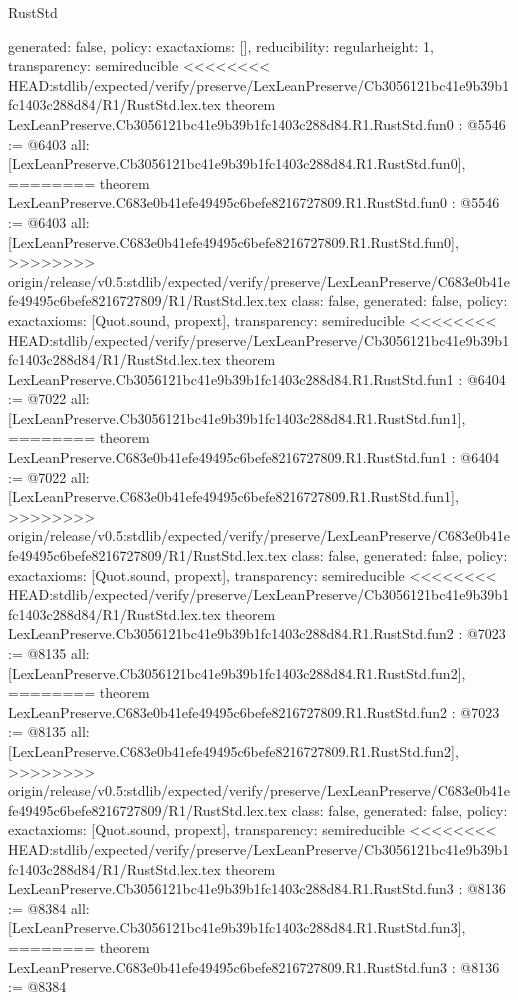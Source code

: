 \begin{lexlean}{RustStd}
\begin{coremodule}
{\begin{coremodule}
{{{  generated: false,
  policy: exact{axioms: []},
  reducibility: regular{height: 1},
  transparency: semireducible
}
<<<<<<<< HEAD:stdlib/expected/verify/preserve/LexLeanPreserve/Cb3056121bc41e9b39b1fc1403c288d84/R1/RustStd.lex.tex
theorem LexLeanPreserve.Cb3056121bc41e9b39b1fc1403c288d84.R1.RustStd.fun0 : @5546 := @6403 {
  all: [LexLeanPreserve.Cb3056121bc41e9b39b1fc1403c288d84.R1.RustStd.fun0],
========
theorem LexLeanPreserve.C683e0b41efe49495c6befe8216727809.R1.RustStd.fun0 : @5546 := @6403 {
  all: [LexLeanPreserve.C683e0b41efe49495c6befe8216727809.R1.RustStd.fun0],
>>>>>>>> origin/release/v0.5:stdlib/expected/verify/preserve/LexLeanPreserve/C683e0b41efe49495c6befe8216727809/R1/RustStd.lex.tex
  class: false,
  generated: false,
  policy: exact{axioms: [Quot.sound, propext]},
  transparency: semireducible
}
<<<<<<<< HEAD:stdlib/expected/verify/preserve/LexLeanPreserve/Cb3056121bc41e9b39b1fc1403c288d84/R1/RustStd.lex.tex
theorem LexLeanPreserve.Cb3056121bc41e9b39b1fc1403c288d84.R1.RustStd.fun1 : @6404 := @7022 {
  all: [LexLeanPreserve.Cb3056121bc41e9b39b1fc1403c288d84.R1.RustStd.fun1],
========
theorem LexLeanPreserve.C683e0b41efe49495c6befe8216727809.R1.RustStd.fun1 : @6404 := @7022 {
  all: [LexLeanPreserve.C683e0b41efe49495c6befe8216727809.R1.RustStd.fun1],
>>>>>>>> origin/release/v0.5:stdlib/expected/verify/preserve/LexLeanPreserve/C683e0b41efe49495c6befe8216727809/R1/RustStd.lex.tex
  class: false,
  generated: false,
  policy: exact{axioms: [Quot.sound, propext]},
  transparency: semireducible
}
<<<<<<<< HEAD:stdlib/expected/verify/preserve/LexLeanPreserve/Cb3056121bc41e9b39b1fc1403c288d84/R1/RustStd.lex.tex
theorem LexLeanPreserve.Cb3056121bc41e9b39b1fc1403c288d84.R1.RustStd.fun2 : @7023 := @8135 {
  all: [LexLeanPreserve.Cb3056121bc41e9b39b1fc1403c288d84.R1.RustStd.fun2],
========
theorem LexLeanPreserve.C683e0b41efe49495c6befe8216727809.R1.RustStd.fun2 : @7023 := @8135 {
  all: [LexLeanPreserve.C683e0b41efe49495c6befe8216727809.R1.RustStd.fun2],
>>>>>>>> origin/release/v0.5:stdlib/expected/verify/preserve/LexLeanPreserve/C683e0b41efe49495c6befe8216727809/R1/RustStd.lex.tex
  class: false,
  generated: false,
  policy: exact{axioms: [Quot.sound, propext]},
  transparency: semireducible
}
<<<<<<<< HEAD:stdlib/expected/verify/preserve/LexLeanPreserve/Cb3056121bc41e9b39b1fc1403c288d84/R1/RustStd.lex.tex
theorem LexLeanPreserve.Cb3056121bc41e9b39b1fc1403c288d84.R1.RustStd.fun3 : @8136 := @8384 {
  all: [LexLeanPreserve.Cb3056121bc41e9b39b1fc1403c288d84.R1.RustStd.fun3],
========
theorem LexLeanPreserve.C683e0b41efe49495c6befe8216727809.R1.RustStd.fun3 : @8136 := @8384 {
}}}}}}}
\end{coremodule}}
\end{coremodule}
\end{lexlean}
